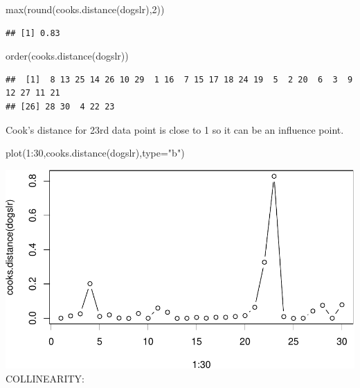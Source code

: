 \documentclass[
]{article}
\newenvironment{Shaded}{\begin{snugshade}}{\end{snugshade}}
\newcommand{\AttributeTok}[1]{\textcolor[rgb]{0.77,0.63,0.00}{#1}}
\newcommand{\DecValTok}[1]{\textcolor[rgb]{0.00,0.00,0.81}{#1}}
\newcommand{\FunctionTok}[1]{\textcolor[rgb]{0.00,0.00,0.00}{#1}}
\newcommand{\NormalTok}[1]{#1}
\newcommand{\SpecialCharTok}[1]{\textcolor[rgb]{0.00,0.00,0.00}{#1}}
\newcommand{\StringTok}[1]{\textcolor[rgb]{0.31,0.60,0.02}{#1}}
\begin{document}
\begin{Shaded}
\begin{Highlighting}[]
\FunctionTok{max}\NormalTok{(}\FunctionTok{round}\NormalTok{(}\FunctionTok{cooks.distance}\NormalTok{(dogslr),}\DecValTok{2}\NormalTok{))}
\end{Highlighting}
\end{Shaded}

\begin{verbatim}
## [1] 0.83
\end{verbatim}

\begin{Shaded}
\begin{Highlighting}[]
\FunctionTok{order}\NormalTok{(}\FunctionTok{cooks.distance}\NormalTok{(dogslr))}
\end{Highlighting}
\end{Shaded}

\begin{verbatim}
##  [1]  8 13 25 14 26 10 29  1 16  7 15 17 18 24 19  5  2 20  6  3  9 12 27 11 21
## [26] 28 30  4 22 23
\end{verbatim}

Cook's distance for 23rd data point is close to 1 so it can be an
influence point.

\begin{Shaded}
\begin{Highlighting}[]
\FunctionTok{plot}\NormalTok{(}\DecValTok{1}\SpecialCharTok{:}\DecValTok{30}\NormalTok{,}\FunctionTok{cooks.distance}\NormalTok{(dogslr),}\AttributeTok{type=}\StringTok{"b"}\NormalTok{)}
\end{Highlighting}
\end{Shaded}

\includegraphics{Assignment2_complete_files/figure-latex/unnamed-chunk-9-1.pdf}
COLLINEARITY:
\end{document}
